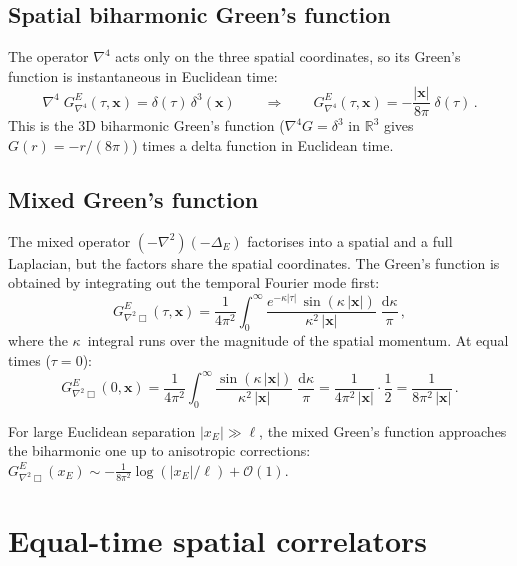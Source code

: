 \documentclass[11pt,a4paper]{article}
\newcommand{\dd}{\mathrm{d}}
\newcommand{\Lap}{\Delta}
\theoremstyle{definition}
\theoremstyle{remark}
\begin{document}
\subsection{Spatial biharmonic Green's function}

The operator $\nabla^4$ acts only on the three spatial coordinates,
so its Green's function is instantaneous in Euclidean time:
\begin{equation}\label{eq:GE-splap4}
  \boxed{
  \nabla^4\; G_{\nabla^4}^E(\tau, \mathbf{x})
  = \delta(\tau)\,\delta^3(\mathbf{x})
  \qquad\Longrightarrow\qquad
  G_{\nabla^4}^E(\tau,\mathbf{x})
  = -\frac{|\mathbf{x}|}{8\pi}\;\delta(\tau)\,.}
\end{equation}
This is the 3D biharmonic Green's function
($\nabla^4 G = \delta^3$ in $\mathbb{R}^3$ gives
$G(r) = -r/(8\pi)$) times a delta function in Euclidean time.

\subsection{Mixed Green's function}

The mixed operator $(-\nabla^2)(-\Lap_E)$ factorises into a
spatial and a full Laplacian, but the factors share the spatial
coordinates.  The Green's function is obtained by integrating out
the temporal Fourier mode first:
\begin{equation}\label{eq:GE-mix}
  \boxed{
  G_{\nabla^2\Box}^E(\tau, \mathbf{x})
  = \frac{1}{4\pi^2}\int_0^\infty
    \frac{e^{-\kappa|\tau|}\,\sin(\kappa\,|\mathbf{x}|)}
         {\kappa^2\,|\mathbf{x}|}\;
    \frac{\dd\kappa}{\pi}\,,}
\end{equation}
where the $\kappa$~integral runs over the magnitude of the spatial
momentum.  At equal times ($\tau = 0$):
\begin{equation}\label{eq:GE-mix-et}
  G_{\nabla^2\Box}^E(0, \mathbf{x})
  = \frac{1}{4\pi^2}\int_0^\infty
    \frac{\sin(\kappa\,|\mathbf{x}|)}
         {\kappa^2\,|\mathbf{x}|}\;
    \frac{\dd\kappa}{\pi}
  = \frac{1}{4\pi^2\,|\mathbf{x}|}\cdot\frac{1}{2}
  = \frac{1}{8\pi^2\,|\mathbf{x}|}\,.
\end{equation}

For large Euclidean separation $|x_E| \gg \ell$, the mixed Green's
function approaches the biharmonic one up to anisotropic corrections:
$G_{\nabla^2\Box}^E(x_E) \sim -\frac{1}{8\pi^2}\log(|x_E|/\ell)
+ \mathcal{O}(1)$.

\section{Equal-time spatial correlators}
\label{sec:equal-time}
\end{document}
